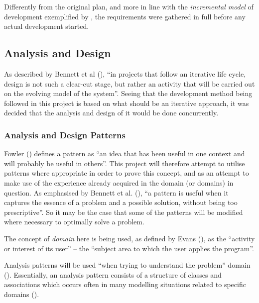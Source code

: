 Differently from the original plan, and more in line with the \emph{incremental
model} of development exemplified by \cite[][pp.~120-124]{dawson2009projects},
the requirements were gathered in full before any actual development started.

\subsection{Analysis and Design} 
As described by Bennett et al (\citeyear[][p.~348]{bennett2010object}), ``in
projects that follow an iterative life cycle, design is not such a clear-cut
stage, but rather an activity that will be carried out on the evolving model of
the system''. Seeing that the development method being followed in this project
is based on what should be an iterative approach, it was decided that the
analysis and design of it would be done concurrently.

\subsubsection{Analysis and Design Patterns}
Fowler (\citeyear[][Section~1.3]{fowler1997analysis}) defines a pattern as ``an
idea that has been useful in one context and will probably be useful in
others''. This project will therefore attempt to utilise patterns where
appropriate in order to prove this concept, and as an attempt to make use of
the experience already acquired in the domain (or domains) in question. As
emphasised by Bennett et al. (\citeyear[][p.~252]{bennett2010object}), ``a
pattern is useful when it captures the essence of a problem and a possible
solution, without being too prescriptive''. So it may be the case that some of
the patterns will be modified where necessary to optimally solve a problem.

The concept of \emph{domain} here is being used, as defined by Evans
(\citeyear[][p.~2]{evans2004domain}), as the ``activity or interest of its
user'' -- the ``subject area to which the user applies the program''.

Analysis patterns will be used ``when trying to understand the problem'' domain
(\cite[][Section~1.1]{fowler1997analysis}). Essentially, an analysis pattern
consists of a structure of classes and associations which occurs often in many
modelling situations related to specific domains
(\cite[][p.~254]{bennett2010object}).
